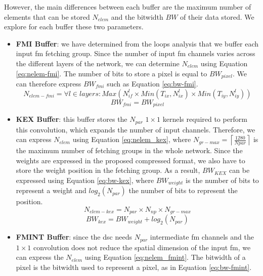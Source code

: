However, the main differences between each buffer are the maximum number of elements that can be stored $N_{elem}$ and the bitwidth $BW$ of their data stored. We explore for each buffer these two parameters.
\begin{itemize}
    \item \textbf{FMI Buffer}: we have determined from the loops analysis that we buffer each input \acrshort{fm} fetching group. Since the number of input \acrshort{fm} channels varies across the different layers of the network, we can determine $N_{elem}$ using Equation \eqref{eq:nelem-fmi}. The number of bits to store a pixel is equal to $BW_{pixel}$. We can therefore express $BW_{fmi}$ such as Equation \eqref{eq:bw-fmi}.
    \begin{equation}
        N_{elem-fmi} = \forall l \in layers: Max\left( N_{if}^l \times Min\left(T_{ix}, N_{ix}^l\right) \times Min\left(T_{iy}, N_{iy}^l\right) \right)
        \label{eq:nelem-fmi}
    \end{equation}
    \begin{equation}
        BW_{fmi} = BW_{pixel}
        \label{eq:bw-fmi}
    \end{equation}
    \item \textbf{KEX Buffer}: this buffer stores the $N_{par}$ $1 \times 1$ kernels required to perform this convolution, which expands the number of input channels. Therefore, we can express $N_{elem}$ using Equation \eqref{eq:nelem_kex}, where $N_{gr-max} = \left\lceil \frac{1280}{Npar} \right\rceil$ is the maximum number of fetching groups in the whole network. Since the weights are expressed in the proposed compressed format, we also have to store the weight position in the fetching group.
    As a result, $BW_{KEX}$ can be expressed using Equation \eqref{eq:bw-kex}, where $BW_{weight}$ is the number of bits to represent a weight and $log_2(N_{par})$ the number of bits to represent the position.
    \begin{equation}
        N_{elem-kex} = N_{par} \times N_{np} \times N_{gr-max}
        \label{eq:nelem_kex}
    \end{equation}
    \begin{equation}
        BW_{kex} = BW_{weight} + log_2(N_{par})
        \label{eq:bw-kex}
    \end{equation}
    \item \textbf{FMINT Buffer}: since the \acrshort{dsc} needs $N_{par}$ intermediate \acrshort{fm} channels and the $1 \times 1$ convolution does not reduce the spatial dimension of the input \acrshort{fm}, we can express the $N_{elem}$ using Equation \eqref{eq:nelem_fmint}. The bitwidth of a pixel is the bitwidth used to represent a pixel, as in Equation \eqref{eq:bw-fmint}.

\end{itemize}
